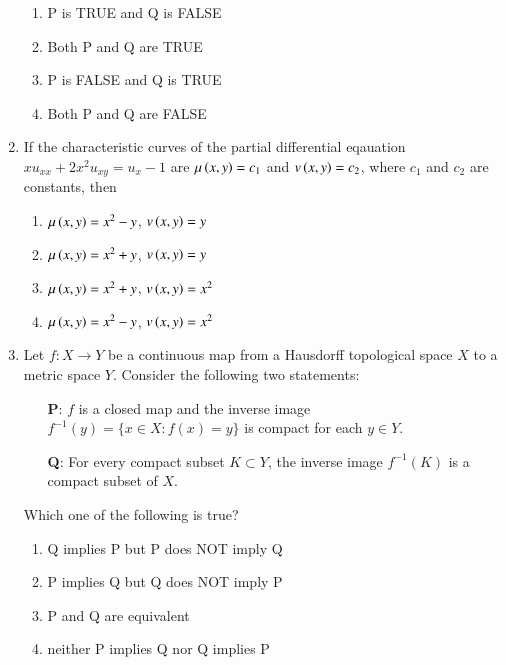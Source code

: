 \documentclass[journal]{IEEEtran}
\begin{document}
\begin{enumerate}
\begin{enumerate}
    \item P is TRUE and Q is FALSE
    \item Both P and Q are TRUE
    \item P is FALSE and Q is TRUE
    \item Both P and Q are FALSE
\end{enumerate}
\vspace{0.5cm}
\item If the characteristic curves of the partial differential eqauation $xu_{xx}+2x^2u_{xy}=u_{x}-1$ are $\mu\left(x,y\right)=c_1$ and $v\left(x,y\right)=c_2$, where $c_1$ and $c_2$ are constants, then 
\begin{enumerate}
    \item $\mu\left(x,y\right)=x^2-y$, $v\left(x,y\right)=y$\item  $\mu\left(x,y\right)=x^2+y$, $v\left(x,y\right)=y$
    \item  $\mu\left(x,y\right)=x^2+y$, $v\left(x,y\right)=x^2$
    \item  $\mu\left(x,y\right)=x^2-y$, $v\left(x,y\right)=x^2$
\end{enumerate}

\vspace{0.5cm}
\item Let \( f : X \to Y \) be a continuous map from a Hausdorff topological space \( X \) to a metric space \( Y \). Consider the following two statements:

\begin{itemize}
    \item[\textbf{P}:] \( f \) is a closed map and the inverse image \( f^{-1}(y) = \{x \in X : f(x) = y\} \) is compact for each \( y \in Y \).
    \item[\textbf{Q}:] For every compact subset \( K \subset Y \), the inverse image \( f^{-1}(K) \) is a compact subset of \( X \).
\end{itemize}

Which one of the following is true?

\begin{enumerate}
    \item Q implies P but P does NOT imply Q
    \item P implies Q but Q does NOT imply P
    \item P and Q are equivalent
    \item neither P implies Q nor Q implies P
\end{enumerate}
\vspace{0.5cm}


\end{enumerate}
\end{document}

